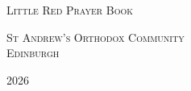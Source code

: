 \thispagestyle{empty}
\enlargethispage{-24mm}
\begin{center}
\vspace*{26mm}
{\scshape\LARGE{} Little Red Prayer Book}

\vspace{8mm}
\ornarule
\vspace{8mm}

{\scshape\normalsize St Andrew's Orthodox Community}\\[2pt]
{\scshape\normalsize Edinburgh}

\vfill
{\scshape\normalsize 2026}
\end{center}

\newpage
